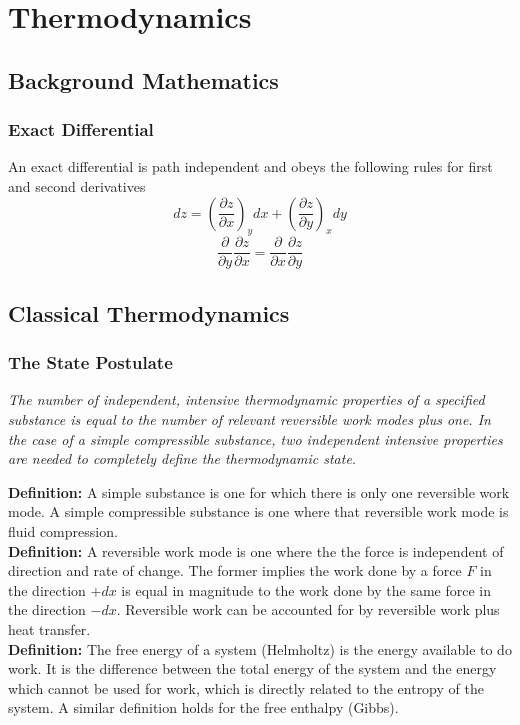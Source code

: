 \documentclass[11pt]{article}
\newcommand{\Partial}[2]{\frac{\partial #1}{\partial #2}}
\newcommand{\PartialConst}[3]{\left(\Partial{#1}{#2}\right)_{#3}}
\begin{document}
\newpage
\section{Thermodynamics}
\subsection{Background Mathematics}
\subsubsection{Exact Differential}
An exact differential is path independent and obeys the following rules for first and second derivatives
$$dz = \PartialConst{z}{x}{y}dx + \PartialConst{z}{y}{x}dy$$
$$\Partial{}{y}\Partial{z}{x} = \Partial{}{x}\Partial{z}{y}$$

\subsection{Classical Thermodynamics}
\subsubsection{The State Postulate}
\large\emph{The number of independent, intensive thermodynamic properties of a specified substance is equal to the number of relevant reversible work modes plus one. In the case of a simple compressible substance, two independent intensive properties are needed to completely define the thermodynamic state.}\\\normalsize

\textbf{Definition:} A simple substance is one for which there is only one reversible work mode. A simple compressible substance is one where that reversible work mode is fluid compression.\\

\textbf{Definition:} A reversible work mode is one where the the force is independent of direction and rate of change. The former implies the work done by a force $F$ in the direction $+dx$ is equal in magnitude to the work done by the same force in the direction $-dx$. Reversible work can be accounted for by reversible work plus heat transfer.\\

\textbf{Definition:} The free energy of a system (Helmholtz) is the energy available to do work. It is the difference between the total energy of the system and the energy which cannot be used for work, which is directly related to the entropy of the system. A similar definition holds for the free enthalpy (Gibbs).
\end{document}
